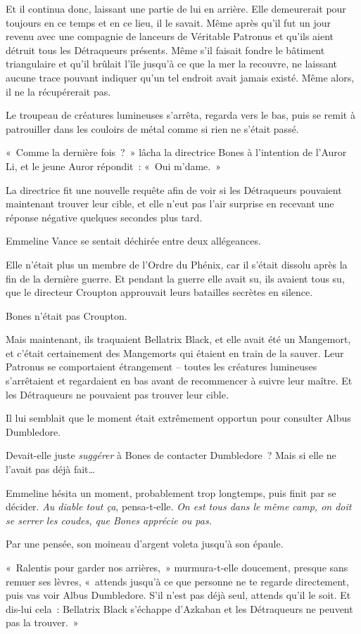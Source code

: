 Et il continua donc, laissant une partie de lui en arrière.
Elle demeurerait pour toujours en ce temps et en ce lieu, il le savait.
Même après qu'il fut un jour revenu avec une compagnie de lanceurs de Véritable Patronus et qu'ils aient détruit tous les Détraqueurs présents.
Même s'il faisait fondre le bâtiment triangulaire et qu'il brûlait l'île jusqu'à ce que la mer la recouvre, ne laissant aucune trace pouvant indiquer qu'un tel endroit avait jamais existé.
Même alors, il ne la récupérerait pas.

\later

Le troupeau de créatures lumineuses s'arrêta, regarda vers le bas, puis se remit à patrouiller dans les couloirs de métal comme si rien ne s'était passé.

«~Comme la dernière fois~?~»
lâcha la directrice Bones à l'intention de l'Auror Li, et le jeune Auror répondit~: «~Oui m'dame.~»

La directrice fit une nouvelle requête afin de voir si les Détraqueurs pouvaient maintenant trouver leur cible, et elle n'eut pas l'air surprise en recevant une réponse négative quelques secondes plus tard.

Emmeline Vance se sentait déchirée entre deux allégeances.

Elle n'était plus un membre de l'Ordre du Phénix, car il s'était dissolu après la fin de la dernière guerre.
Et pendant la guerre elle avait su, ils avaient tous su, que le directeur Croupton approuvait leurs batailles secrètes en silence.

Bones n'était pas Croupton.

Mais maintenant, ils traquaient Bellatrix Black, et elle avait été un Mangemort, et c'était certainement des Mangemorts qui étaient en train de la sauver.
Leur Patronus se comportaient étrangement -- toutes les créatures lumineuses s'arrêtaient et regardaient en bas avant de recommencer à suivre leur maître.
Et les Détraqueurs ne pouvaient pas trouver leur cible.

Il lui semblait que le moment était extrêmement opportun pour consulter Albus Dumbledore.

Devait-elle juste \emph{suggérer} à Bones de contacter Dumbledore~?
Mais si elle ne l'avait pas déjà fait…

Emmeline hésita un moment, probablement trop longtemps, puis finit par se décider.
\emph{Au diable tout ça}, pensa-t-elle.
\emph{On est tous dans le même camp, on doit se serrer les coudes, que Bones apprécie ou pas.}

Par une pensée, son moineau d'argent voleta jusqu'à son épaule.

«~Ralentis pour garder nos arrières,~» murmura-t-elle doucement, presque sans remuer ses lèvres, «~attends jusqu'à ce que personne ne te regarde directement, puis vas voir Albus Dumbledore.
S'il n'est pas déjà seul, attends qu'il le soit.
Et dis-lui cela~: Bellatrix Black s'échappe d'Azkaban et les Détraqueurs ne peuvent pas la trouver.~»

